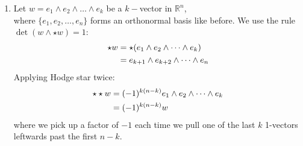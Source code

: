 \documentclass{article}
\begin{document}
\begin{enumerate}[label=(\alph*)]
    \item
    Let $w=e_1 \wedge e_2 \wedge \dots \wedge e_k$ be a $k-$vector in $\mathbb{R}^n$,\\
    where $\{e_1, e_2, \dots, e_n\}$ forms an orthonormal basis like before. We use the rule $\det(w \wedge \star w) = 1$:
    \begin{align}
        \star w &= \star(e_1 \wedge e_2 \wedge \dots \wedge e_k) \notag\\
                &= e_{k+1} \wedge e_{k+2} \wedge \dots \wedge e_n \notag
    \end{align}
    Applying Hodge star twice:\\
    \begin{align}
        \star \star w &= (-1)^{k(n-k)} e_1 \wedge e_2 \wedge \dots \wedge e_k \notag\\
                    &= (-1)^{k(n-k)} w \notag
    \end{align}
    where we pick up a factor of $-1$ each time we pull one of the last $k$ 1-vectors leftwards past the first $n-k$.
\end{enumerate}



\vspace{1.8cm}
\\\\
\end{document}
